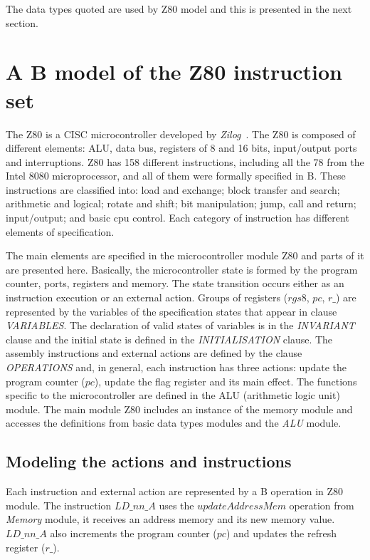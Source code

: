 \documentclass[a4paper]{llncs}
\begin{document}
 The data types quoted are used by Z80 model and this is presented in the next section.


\section{A B model of the Z80 instruction set}
\label{sec:z80}

The Z80 is a CISC microcontroller developed by \textit{Zilog}~\cite{Z80_manual}. 
The Z80 is composed of different elements: ALU, data bus, registers of 8 and 16
bits, input/output ports and interruptions. Z80 has 158 different instructions, 
including all the 78 from the Intel 8080 microprocessor, and all of them were
formally specified in B. These instructions are classified into: load and
exchange; block transfer and search; arithmetic and logical; rotate
and shift; bit manipulation; jump, call and return; input/output; and
basic cpu control. Each category of instruction has different elements
of specification.

The main elements are specified in the microcontroller module Z80 and parts of it are presented here.  Basically, the
microcontroller state is formed by the program counter, ports,
registers and memory. The state transition occurs either as an instruction
execution or an external action. Groups of registers ($rgs8$, $pc$, $r\_$) are represented
by the variables of the specification states that appear in clause
\textit{VARIABLES}. The declaration of valid states of variables is in
the \textit{INVARIANT} clause and the initial state is defined in the
\textit{INITIALISATION} clause. The assembly instructions and external actions are defined
by the clause \textit{OPERATIONS} and, in general, each instruction
has three actions: update the program counter ($pc$), update the flag
register and its main effect.
The functions specific to the microcontroller are defined in the ALU
(arithmetic logic unit) module. The main module Z80 includes an instance of
the memory module and accesses the definitions from basic data types
modules and the \textit{ALU} module.


\subsection{Modeling the actions and instructions}
Each instruction and external action are represented by a B operation in Z80 module. 
The instruction $\textit{LD\_nn\_A}$ uses the $\textit{updateAddressMem}$
operation from \textit{Memory} module, it receives an address memory
and its new memory value. $\textit{LD\_nn\_A}$ also increments the
program counter ($\textit{pc}$) and updates the refresh register ($\textit{r\_}$). \\
\end{document}
